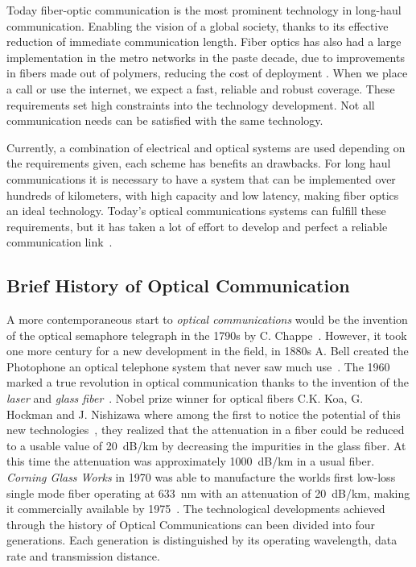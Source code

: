 Today fiber-optic communication is the most prominent technology in long-haul communication. Enabling the vision of a global society, thanks to its effective reduction of immediate communication length. Fiber optics has also had a large implementation in the metro networks in the paste decade, due to improvements in fibers made out of polymers, reducing the cost of deployment \cite{AccesFiber}. When we place a call or use the internet, we expect a fast, reliable and robust coverage. These requirements set high constraints into the technology  development. Not all communication needs can be satisfied with the same technology.

 Currently, a combination of electrical and optical systems are used depending on the requirements given, each scheme has benefits an drawbacks. For long haul communications it is necessary to have a system that can be implemented over hundreds of kilometers, with high capacity and low latency, making fiber optics an ideal technology. Today's optical communications systems can fulfill these requirements, but it has taken a lot of effort to develop and perfect a reliable communication link~\cite{COChistory}.   

\subsection{Brief History of Optical Communication}

A more contemporaneous start to \textit{optical communications} would be the invention of the optical semaphore telegraph in the 1790s by C. Chappe~\cite{opticalsemaphore}. However, it took one more century for a new development in the field, in 1880s A. Bell created the Photophone an optical telephone system that never saw much use~\cite{opticalsemaphore,HistoryCommunication}. The 1960 marked a true revolution in optical communication thanks to the invention of the \textit{laser} and \textit{glass fiber}~\cite{ramaswami2009optical}. Nobel prize winner for optical fibers C.K. Koa, G. Hockman and J. Nishizawa  where among the first to notice the potential of this new technologies~\cite{kao1966dielectric,ProposeFiberCom}, they realized that the attenuation in a fiber could be reduced to a usable value of 20~dB/km by decreasing the impurities in the glass fiber. At this time the attenuation was approximately 1000~dB/km in a usual fiber.\textit{ Corning Glass Works} in 1970 was able to manufacture the worlds first low-loss single mode fiber operating at 633~nm with an attenuation of 20~dB/km, making it commercially available by 1975~\cite{opticalsemaphore,HistoryCommunication}. The technological developments  achieved through the history of Optical Communications  can been divided into four generations.  Each generation is distinguished by its operating wavelength, data rate and transmission distance.

